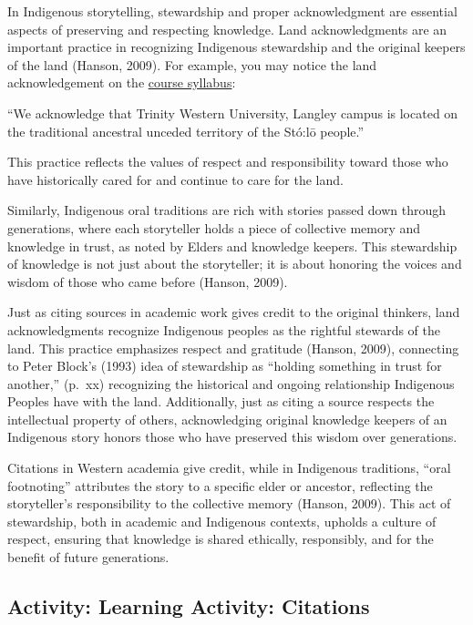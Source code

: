 \documentclass[
  letterpaper,
  DIV=11,
  numbers=noendperiod]{scrreprt}
\begin{document}
In Indigenous storytelling, stewardship and proper acknowledgment are
essential aspects of preserving and respecting knowledge. Land
acknowledgments are an important practice in recognizing Indigenous
stewardship and the original keepers of the land (Hanson, 2009). For
example, you may notice the land acknowledgement on the
\href{https://learn.twu.ca/mod/resource/view.php?id=1171447}{course
syllabus}:

``We acknowledge that Trinity Western University, Langley campus is
located on the traditional ancestral unceded territory of the Stó:lō
people.''

This practice reflects the values of respect and responsibility toward
those who have historically cared for and continue to care for the land.

Similarly, Indigenous oral traditions are rich with stories passed down
through generations, where each storyteller holds a piece of collective
memory and knowledge in trust, as noted by Elders and knowledge keepers.
This stewardship of knowledge is not just about the storyteller; it is
about honoring the voices and wisdom of those who came before (Hanson,
2009).

Just as citing sources in academic work gives credit to the original
thinkers, land acknowledgments recognize Indigenous peoples as the
rightful stewards of the land. This practice emphasizes respect and
gratitude (Hanson, 2009), connecting to Peter Block's (1993) idea of
stewardship as ``holding something in trust for another,'' (p.~xx)
recognizing the historical and ongoing relationship Indigenous Peoples
have with the land. Additionally, just as citing a source respects the
intellectual property of others, acknowledging original knowledge
keepers of an Indigenous story honors those who have preserved this
wisdom over generations.

Citations in Western academia give credit, while in Indigenous
traditions, ``oral footnoting'' attributes the story to a specific elder
or ancestor, reflecting the storyteller's responsibility to the
collective memory (Hanson, 2009). This act of stewardship, both in
academic and Indigenous contexts, upholds a culture of respect, ensuring
that knowledge is shared ethically, responsibly, and for the benefit of
future generations.

\subsection*{Activity: Learning Activity:
Citations}\label{activity-learning-activity-citations}
\end{document}
